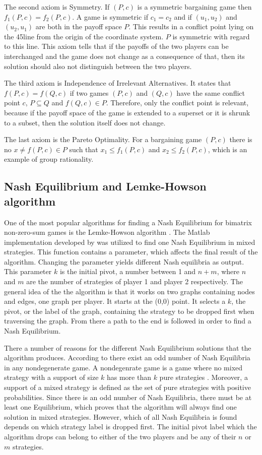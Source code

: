 The second axiom is Symmetry. If $(P,c)$ is a symmetric bargaining game then $f_1(P,c) = f_2(P,c)$. A game is symmetric if $c_1 = c_2$ and if $(u_1, u_2)$ and $(u_2, u_1)$ are both in the payoff space $P$. This results in a conflict point lying on the 45\textdegree  line from the origin of the coordinate system. $P$ is symmetric with regard to this line. This axiom tells that if the payoffs of the two players can be interchanged and the game does not change as a consequence of that, then its solution should also not distinguish between the two players.

The third axiom is Independence of Irrelevant Alternatives. It states that $f(P,c) = f(Q,c)$ if two games $(P,c)$ and $(Q,c)$ have the same conflict point $c$, $P \subseteq Q$ and $f(Q,c) \in P$. Therefore, only the conflict point is relevant, because if the payoff space of the game is extended to a superset or it is shrunk to a subset, then the solution itself does not change.

The last axiom is the Pareto Optimality. For a bargaining game $(P,c)$ there is no $x \neq f(P,c) \in P$ such that $x_1 \leq f_1(P,c)$ and $x_2 \leq f_2(P,c)$, which is an example of group rationality.

\subsection{Nash Equilibrium and Lemke-Howson algorithm}
One of the most popular algorithms for finding a Nash Equilibrium for bimatrix non-zero-sum games is the Lemke-Howson algorithm \citep{lemke1964equilibrium}. The Matlab implementation developed by \citet{lemkeHowson2014Matlab} was utilized to find one Nash Equilibrium in mixed strategies. This function contains a parameter, which affects the final result of the algorithm. Changing the parameter yields different Nash equilibria as output. This parameter $k$ is the initial pivot, a number between 1 and $n+m$, where $n$ and $m$ are the number of strategies of player 1 and player 2 respectively. The general idea of the the algorithm is that it works on two graphs containing nodes and edges, one graph per player. It starts at the (0,0) point. It selects a $k$, the pivot, or the label of the graph, containing the strategy to be dropped first when traversing the graph. From there a path to the end is followed in order to find a Nash Equilibrium. 

There a number of reasons for the different Nash Equilibrium solutions that the algorithm produces. According to \citet{lemke1964equilibrium} there exist an odd number of Nash Equilibria in any nondegenerate game. A nondegenrate game is a game where no mixed strategy with a support of size $k$ has more than $k$ pure strategies \citep{nisan2007algorithmic}. Moreover, a support of a mixed strategy is defined as the set of pure strategies with positive probabilities. Since there is an odd number of Nash Equilibria, there must be at least one Equilibrium, which proves that the algorithm will always find one solution in mixed strategies. However, which of all Nash Equilibria is found depends on which strategy label is dropped first. The initial pivot label which the algorithm drops can belong to either of the two players and be any of their $n$ or $m$ strategies.

